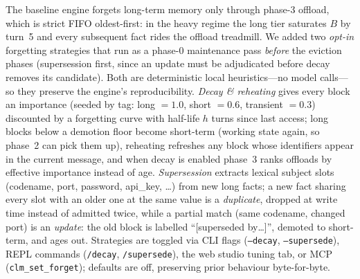 \documentclass[10pt]{article}
\begin{document}
The baseline engine forgets long-term memory only through phase-3 offload,
which is strict FIFO oldest-first: in the heavy regime the long tier saturates
$B$ by turn~5 and every subsequent fact rides the offload treadmill. We added
two \emph{opt-in} forgetting strategies that run as a phase-0 maintenance pass
\emph{before} the eviction phases (supersession first, since an update must be
adjudicated before decay removes its candidate). Both are deterministic local
heuristics---no model calls---so they preserve the engine's reproducibility.
\emph{Decay \& reheating} gives every block an importance (seeded by tag:
long $=1.0$, short $=0.6$, transient $=0.3$) discounted by a forgetting curve
with half-life $h$ turns since last access; long blocks below a demotion floor
become short-term (working state again, so phase~2 can pick them up), reheating
refreshes any block whose identifiers appear in the current message, and when
decay is enabled phase~3 ranks offloads by effective importance instead of
age. \emph{Supersession} extracts lexical subject slots (codename, port,
password, api\_key, \dots) from new long facts; a new fact sharing every slot
with an older one at the same value is a \emph{duplicate}, dropped at write
time instead of admitted twice, while a partial match (same codename, changed
port) is an \emph{update}: the old block is labelled ``[superseded by\dots]'',
demoted to short-term, and ages out. Strategies are toggled via CLI flags
(\texttt{--decay}, \texttt{--supersede}), REPL commands (\texttt{/decay},
\texttt{/supersede}), the web studio tuning tab, or MCP
(\texttt{clm\_set\_forget}); defaults are off, preserving prior behaviour
byte-for-byte.
\end{document}
